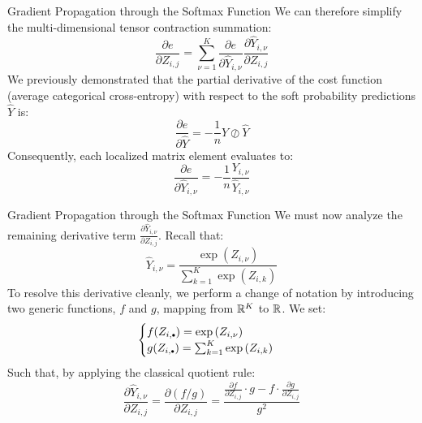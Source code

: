 \begin{frame}{Gradient Propagation through the Softmax Function}
	We can therefore simplify the multi-dimensional tensor contraction summation:
	\begin{equation*}
		\frac{\partial{e}}{\partial{Z_{i,j}}} = \sum_{\nu=1}^K \frac{\partial{e}}{\partial{\hat{Y}_{i,\nu}}} \frac{\partial{\hat{Y}_{i,\nu}}}{\partial{Z_{i,j}}}
	\end{equation*}
	\pause
	We previously demonstrated that the partial derivative of the cost function (average categorical cross-entropy) with respect to the soft probability predictions $\hat{Y}$ is:
	\begin{equation*}
		\frac{\partial{e}}{\partial{\hat{Y}}} = - \frac{1}{n} Y \oslash \hat{Y}
	\end{equation*}
	Consequently, each localized matrix element evaluates to:
	\begin{equation*}
		\frac{\partial{e}}{\partial{\hat{Y}_{i,\nu}}} = - \frac{1}{n} \frac{Y_{i,\nu}}{\hat{Y}_{i,\nu}}
	\end{equation*}
\end{frame}

\begin{frame}{Gradient Propagation through the Softmax Function}
	We must now analyze the remaining derivative term $\frac{\partial{\hat{Y}_{i,\nu}}}{\partial{Z_{i,j}}}$. Recall that:
	\begin{equation*}
		\hat{Y}_{i,\nu} = \frac{\exp{(Z_{i,\nu})}}{\sum_{k=1}^K \exp{(Z_{i,k})}}
	\end{equation*}
	\pause
	To resolve this derivative cleanly, we perform a change of notation by introducing two generic functions, $f$ and $g$, mapping from $\mathbb{R}^K$ to $\mathbb{R}$. We set:
	\begin{equation*}
		\begin{cases}
			f(Z_{i,\bigdot}) = \exp{(Z_{i,\nu})} \\
			g(Z_{i,\bigdot}) = \sum_{k=1}^K \exp{(Z_{i,k})}
		\end{cases}
	\end{equation*}
	\pause
	Such that, by applying the classical quotient rule:
	\begin{equation*}
		\frac{\partial{\hat{Y}_{i,\nu}}}{\partial{Z_{i,j}}} = \frac{\partial{(f / g)}}{\partial{Z_{i,j}}} =  \frac{\frac{\partial{f}}{\partial{Z_{i,j}}} \cdot g - f \cdot \frac{\partial{g}}{\partial{Z_{i,j}}}}{g^2}
	\end{equation*}
\end{frame}

